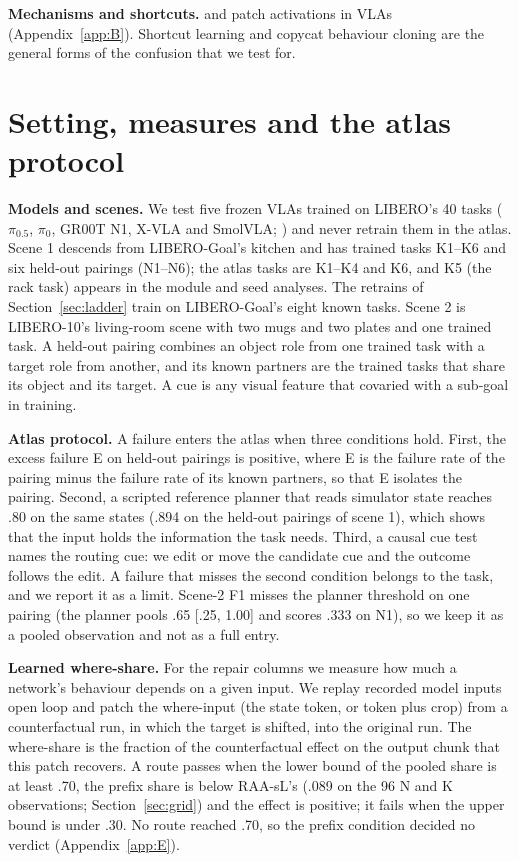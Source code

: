 \documentclass{article}
\newcommand{\pifive}{$\pi_{0.5}$}
\newcommand{\pizero}{$\pi_0$}
\begin{document}
\textbf{Mechanisms and shortcuts.} \citet{grant2603} and \citet{wulff2610} patch activations in VLAs (Appendix~\ref{app:B}). Shortcut learning \citep{geirhos2020} and copycat behaviour cloning \citep{wen2020} are the general forms of the confusion that we test for.

\section{Setting, measures and the atlas protocol}
\label{sec:setting}

\textbf{Models and scenes.} We test five frozen VLAs trained on LIBERO's 40 tasks \citep{libero2306} (\pifive, \pizero, GR00T N1, X-VLA and SmolVLA; \citealp{pi05_2504,pi0_2410,gr00tn1_2503,xvla2510,smolvla2506}) and never retrain them in the atlas. Scene 1 descends from LIBERO-Goal's kitchen and has trained tasks K1--K6 and six held-out pairings (N1--N6); the atlas tasks are K1--K4 and K6, and K5 (the rack task) appears in the module and seed analyses. The retrains of Section~\ref{sec:ladder} train on LIBERO-Goal's eight known tasks. Scene 2 is LIBERO-10's living-room scene with two mugs and two plates and one trained task. A held-out pairing combines an object role from one trained task with a target role from another, and its known partners are the trained tasks that share its object and its target. A cue is any visual feature that covaried with a sub-goal in training.

\textbf{Atlas protocol.} A failure enters the atlas when three conditions hold. First, the excess failure E on held-out pairings is positive, where E is the failure rate of the pairing minus the failure rate of its known partners, so that E isolates the pairing. Second, a scripted reference planner that reads simulator state reaches .80 on the same states (.894 on the held-out pairings of scene 1), which shows that the input holds the information the task needs. Third, a causal cue test names the routing cue: we edit or move the candidate cue and the outcome follows the edit. A failure that misses the second condition belongs to the task, and we report it as a limit. Scene-2 F1 misses the planner threshold on one pairing (the planner pools .65 [.25, 1.00] and scores .333 on N1), so we keep it as a pooled observation and not as a full entry.

\textbf{Learned where-share.} For the repair columns we measure how much a network's behaviour depends on a given input. We replay recorded model inputs open loop and patch the where-input (the state token, or token plus crop) from a counterfactual run, in which the target is shifted, into the original run. The where-share is the fraction of the counterfactual effect on the output chunk that this patch recovers. A route passes when the lower bound of the pooled share is at least .70, the prefix share is below RAA-sL's (.089 on the 96 N and K observations; Section~\ref{sec:grid}) and the effect is positive; it fails when the upper bound is under .30. No route reached .70, so the prefix condition decided no verdict (Appendix~\ref{app:E}).
\end{document}
